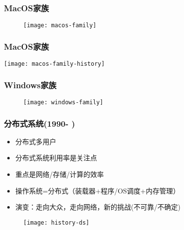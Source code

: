 \begin{frame}[plain]
    
    \frametitle{MacOS家族}
    
    \begin{figure}
        \centering
        \texttt{[image: macos-family]}
    \end{figure}
    
\end{frame}
\begin{frame}[plain]
    
    \frametitle{MacOS家族}
    
    \texttt{[image: macos-family-history]}
    
\end{frame}

\begin{frame}
    
    \frametitle{Windows家族}
    
    \begin{figure}
        \centering
        \texttt{[image: windows-family]}
    \end{figure}
    
\end{frame}

\begin{frame}[plain]
	
	\frametitle{分布式系统(1990- )}
	
	

	\begin{itemize}
		\item 分布式多用户
		\item 分布式系统利用率是关注点	
		\item 重点是网络/存储/计算的效率
		\item 操作系统=分布式（装载器+程序/OS调度+内存管理）
		\item 演变：走向大众，走向网络，新的挑战(不可靠/不确定)
	\end{itemize}
	
	\begin{figure}
		\centering
		\texttt{[image: history-ds]}
	\end{figure}
	
\end{frame}

